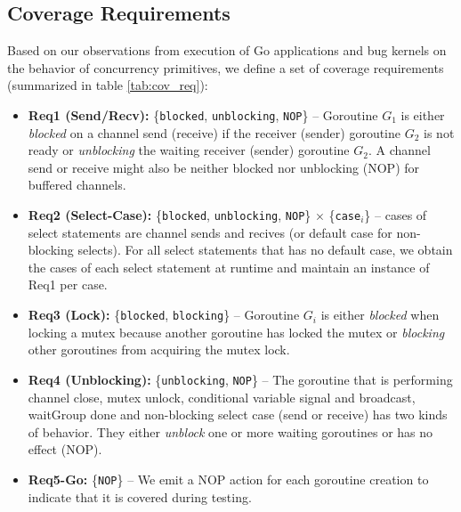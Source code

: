\subsection{Coverage Requirements}
\label{sec:covreq}
Based on our observations from execution of Go applications and bug kernels on the behavior of concurrency primitives, we define a set of coverage requirements (summarized in table \ref{tab:cov_req}):
%
\begin{itemize}
  \item \textbf{Req1 (Send/Recv):} \{\texttt{blocked}, \texttt{unblocking}, \texttt{NOP}\} -- Goroutine $G_1$ is either \textit{blocked} on a channel send (receive) if the receiver (sender) goroutine $G_2$ is not ready or \textit{unblocking} the waiting receiver (sender) goroutine $G_2$. A channel send or receive might also be neither blocked nor unblocking (NOP) for buffered channels.
  \item \textbf{Req2 (Select-Case):} \{\texttt{blocked}, \texttt{unblocking}, \texttt{NOP}\} $\times$ \{\texttt{case}$_i$\} -- cases of select statements are channel sends and recives (or default case for non-blocking selects). For all select statements that has no default case, we obtain the cases of each select statement at runtime and maintain an instance of Req1 per case.
  \item \textbf{Req3 (Lock):} \{\texttt{blocked}, \texttt{blocking}\} -- Goroutine $G_i$ is either \textit{blocked} when locking a mutex because another goroutine has locked the mutex or \textit{blocking} other goroutines from acquiring the mutex lock.
  \item \textbf{Req4 (Unblocking):} \{\texttt{unblocking}, \texttt{NOP}\} -- The goroutine that is performing channel close, mutex unlock, conditional variable signal and broadcast, waitGroup done and non-blocking select case (send or receive) has two kinds of behavior. They either \textit{unblock} one or more waiting goroutines or has no effect (NOP).
  \item \textbf{Req5-Go:} \{\texttt{NOP}\} -- We emit a NOP action for each goroutine creation to indicate that it is covered during testing.
\end{itemize}


